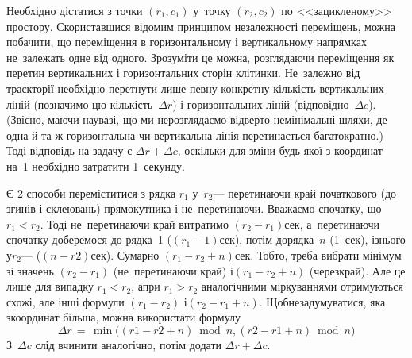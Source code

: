 \documentclass[14pt,a4paper]{extarticle}
\begin{document}
{

\Tutorial	Необхідно дістатися з точки $(r_1, c_1)$ у~точку $(r_2, c_2)$ по <<зацикленому>> простору. 
Скориставшися відомим принципом незалежності переміщень, можна побачити, що переміщення в горизонтальному і вертикальному напрямках не~залежать одне від одного. Зрозуміти це можна, розглядаючи переміщення як перетин вертикальних і горизонтальних сторін клітинки. Не~залежно від траєкторії необхідно перетнути лише певну конкретну кількість вертикальних ліній (позначимо цю кількість~$\Delta{}r$) і горизонтальних ліній (відповідно~$\Delta{}c$). (Звісно, маючи на\nolinebreak[3] увазі, що ми не\nolinebreak[3] розглядаємо відверто не\nolinebreak[3] мінімальні шляхи, де одна й та ж горизонтальна чи вертикальна лінія перетинається багатократно.) Тоді відповідь на задачу є ${\Delta{}r+\Delta{}c}$, оскільки для зміни будь якої з координат на~1 необхідно затратити 1~секунду.

Є 2 способи переміститися з рядка $r_1$ у~$r_2$\nolinebreak[3] --- перетинаючи край початкового (до згинів і склеювань) прямокутника і не~перетинаючи. Вважаємо спочатку, що ${r_1{<}r_2}$. Тоді не~перетинаючи край витратимо ${(r_2{-}r_1)}$\nolinebreak[2] сек, а~перетинаючи спочатку доберемося до рядка~1 (${(r_1{-}1)}$\nolinebreak[2] сек),  потім до\nolinebreak[1] рядка~$n$ (1~сек), і\nolinebreak[2] з\nolinebreak[2] нього у\nolinebreak[3] $r_2$\nolinebreak[3] --- (${(n{-}r2)}$\nolinebreak[2] сек). Сумарно ${(r_1{-}r_2{+}n)}$\nolinebreak[2] сек. 
Тобто, треба вибрати мінімум зі значень ${(r_2{-}r_1)}$ (не~перетинаючи край) і\nolinebreak[3] ${(r_1{-}r_2{+}n)}$ (через\nolinebreak[3] край). Але це лише для випадку ${r_1{<}r_2}$, а\nolinebreak[3] при ${r_1{>}r_2}$ аналогічними міркуваннями отримуються схожі, але інші формули ${(r_1{-}r_2)}$ і\nolinebreak[3] ${(r_2{-}r_1{+}n)}$. Щоб\nolinebreak[2] не\nolinebreak[2] задумуватися, яка з\nolinebreak[3] координат більша, можна використати формулу
$$
\Delta{}r \, = \, \min\bigl((r1-r2+n) \bmod n, (r2-r1+n) \bmod n\bigr)
$$
З~$\Delta{}c$ слід вчинити аналогічно, потім додати ${\Delta{}r+\Delta{}c}$.

}
\end{document}
